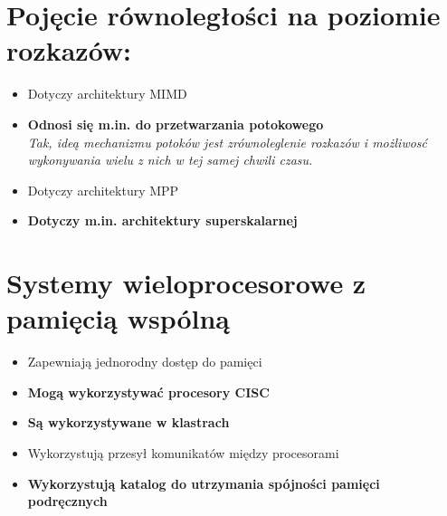 \documentclass[a4paper,twoside]{article}
\begin{document}
\section{Pojęcie równoległości na poziomie rozkazów:}
	\begin{itemize}
    \item Dotyczy architektury MIMD
    \item \textbf{Odnosi się m.in. do przetwarzania potokowego}\\
    {\small \emph{Tak, ideą mechanizmu potoków jest zrównoleglenie rozkazów i możliwosć wykonywania wielu z nich w tej samej chwili czasu.}}
    \item Dotyczy architektury MPP
    \item \textbf{Dotyczy m.in. architektury superskalarnej}
    \end{itemize}

\section{Systemy wieloprocesorowe z pamięcią wspólną}
	\begin{itemize}
    \item Zapewniają jednorodny dostęp do pamięci
    \item \textbf{Mogą wykorzystywać procesory CISC}
    \item \textbf{Są wykorzystywane w klastrach}
    \item Wykorzystują przesył komunikatów między procesorami
    \item \textbf{Wykorzystują katalog do utrzymania spójności pamięci podręcznych}
    \end{itemize}

\end{document}
